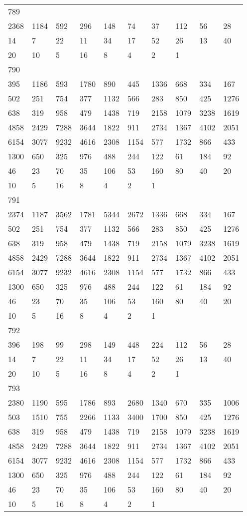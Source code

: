 \begin{longtable}{*{10}{l}}
789&&&&&&&&&\\
2368& 1184& 592& 296& 148& 74& 37& 112& 56& 28\\
14& 7& 22& 11& 34& 17& 52& 26& 13& 40\\
20& 10& 5& 16& 8& 4& 2& 1& \\

790&&&&&&&&&\\
395& 1186& 593& 1780& 890& 445& 1336& 668& 334& 167\\
502& 251& 754& 377& 1132& 566& 283& 850& 425& 1276\\
638& 319& 958& 479& 1438& 719& 2158& 1079& 3238& 1619\\
4858& 2429& 7288& 3644& 1822& 911& 2734& 1367& 4102& 2051\\
6154& 3077& 9232& 4616& 2308& 1154& 577& 1732& 866& 433\\
1300& 650& 325& 976& 488& 244& 122& 61& 184& 92\\
46& 23& 70& 35& 106& 53& 160& 80& 40& 20\\
10& 5& 16& 8& 4& 2& 1& \\

791&&&&&&&&&\\
2374& 1187& 3562& 1781& 5344& 2672& 1336& 668& 334& 167\\
502& 251& 754& 377& 1132& 566& 283& 850& 425& 1276\\
638& 319& 958& 479& 1438& 719& 2158& 1079& 3238& 1619\\
4858& 2429& 7288& 3644& 1822& 911& 2734& 1367& 4102& 2051\\
6154& 3077& 9232& 4616& 2308& 1154& 577& 1732& 866& 433\\
1300& 650& 325& 976& 488& 244& 122& 61& 184& 92\\
46& 23& 70& 35& 106& 53& 160& 80& 40& 20\\
10& 5& 16& 8& 4& 2& 1& \\

792&&&&&&&&&\\
396& 198& 99& 298& 149& 448& 224& 112& 56& 28\\
14& 7& 22& 11& 34& 17& 52& 26& 13& 40\\
20& 10& 5& 16& 8& 4& 2& 1& \\

793&&&&&&&&&\\
2380& 1190& 595& 1786& 893& 2680& 1340& 670& 335& 1006\\
503& 1510& 755& 2266& 1133& 3400& 1700& 850& 425& 1276\\
638& 319& 958& 479& 1438& 719& 2158& 1079& 3238& 1619\\
4858& 2429& 7288& 3644& 1822& 911& 2734& 1367& 4102& 2051\\
6154& 3077& 9232& 4616& 2308& 1154& 577& 1732& 866& 433\\
1300& 650& 325& 976& 488& 244& 122& 61& 184& 92\\
46& 23& 70& 35& 106& 53& 160& 80& 40& 20\\
10& 5& 16& 8& 4& 2& 1& \\


\end{longtable}
